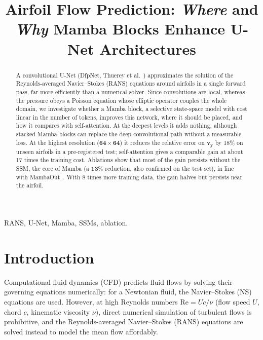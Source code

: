 \documentclass[conference]{IEEEtran}
\begin{document}
\title{Airfoil Flow Prediction: \textit{Where} and \textit{Why} Mamba Blocks Enhance U-Net Architectures}

\author{
}
\maketitle

\begin{abstract}
A convolutional U-Net (DfpNet, Thuerey et al.~\cite{thuerey2020}) approximates
the solution of the Reynolds-averaged Navier--Stokes (RANS) equations around
airfoils in a single forward pass, far more efficiently than a numerical solver.
Since convolutions are local, whereas the pressure obeys a Poisson equation whose
elliptic operator couples the whole domain, we investigate whether a Mamba block, a
selective state-space model with cost linear in the number of tokens, improves
this network, where it should be placed, and how it compares with
self-attention. At the deepest levels it adds nothing, although stacked Mamba
blocks can replace the deep convolutional path without a measurable loss. At
the highest resolution ($\boldsymbol{64\times64}$) it reduces the relative error on $\boldsymbol{v_y}$ by
18\% on unseen airfoils in a pre-registered test; self-attention gives a
comparable gain at about 17 times the training cost. Ablations show that most
of the gain persists without the SSM, the core of Mamba (a $\boldsymbol{13\%}$ reduction, also
confirmed on the test set), in line with MambaOut~\cite{yu2025mambaout}. With
8 times more training data, the gain halves but persists near the airfoil.
\end{abstract}

\begin{IEEEkeywords}
RANS, U-Net, Mamba, SSMs, ablation.
\end{IEEEkeywords}

\section{Introduction}

Computational fluid dynamics (CFD) predicts fluid flows by solving their
governing equations numerically: for a Newtonian fluid, the Navier--Stokes
(NS) equations are used. However, at high Reynolds numbers
$\mathrm{Re}=Uc/\nu$ (flow speed $U$, chord $c$, kinematic viscosity $\nu$),
direct numerical simulation of turbulent flows is prohibitive, and the
Reynolds-averaged Navier--Stokes (RANS) equations are solved instead to model
the mean flow affordably.
\end{document}
